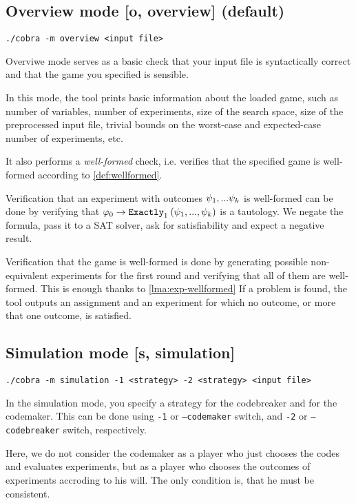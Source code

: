\subsection{Overview mode [o, overview] (default)}

\centerline{\texttt{./cobra -m overview <input file> }}
\medskip

Overviwe mode serves as a basic check that your input file is
  syntactically correct and that the game you specified is sensible.

In this mode, the tool prints basic information about the loaded game, such as
  number of variables, number of experiments, size of the search space,
  size of the preprocessed input file,
  trivial bounds on the worst-case and expected-case number of experiments, etc.

It also performs a \emph{well-formed} check, i.e. verifies that the
  specified game is well-formed according to \autoref{def:wellformed}.

Verification that an experiment with outcomes $\psi_1,...\psi_k$ is well-formed
  can be done by verifying that $\varphi_0->\mathtt{Exactly}_{1}\:(\psi_1, ..., \psi_k)$
  is a tautology.
We negate the formula, pass it to a SAT solver, ask for satisfiability and expect a negative result.

Verification that the game is well-formed is done by
  generating possible non-equivalent experiments for the first round
  and verifying that all of them are well-formed.
This is enough thanks to \autoref{lma:exp-wellformed}
If a problem is found, the tool outputs an assignment and an experiment
  for which no outcome, or more that one outcome, is satisfied.

\subsection{Simulation mode [s, simulation]}

\centerline{\texttt{./cobra -m simulation -1 <strategy> -2 <strategy> <input file> }}

In the simulation mode, you specify a strategy for
  the codebreaker and for the codemaker.
This can be done using \texttt{-1} or \texttt{--codemaker} switch, and
\texttt{-2} or \texttt{--codebreaker} switch, respectively.

Here, we do not consider the codemaker as a player who just chooses the codes
and evaluates experiments, but as a player who chooses the outcomes
of experiments accroding to his will.
The only condition is, that he must be consistent.

